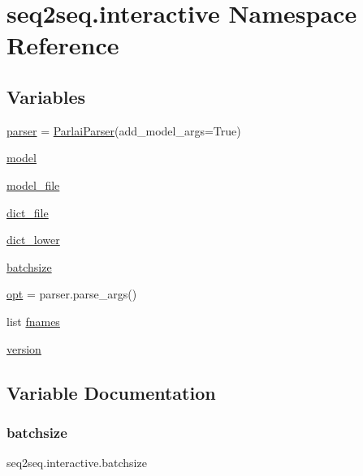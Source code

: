 \hypertarget{namespaceseq2seq_1_1interactive}{}\section{seq2seq.\+interactive Namespace Reference}
\label{namespaceseq2seq_1_1interactive}
\subsection*{Variables}
\begin{DoxyCompactItemize}
\item 
\hyperlink{namespaceseq2seq_1_1interactive_a30c7c17d3501869dc954ba79b1bb1703}{parser} = \hyperlink{classparlai_1_1core_1_1params_1_1ParlaiParser}{Parlai\+Parser}(add\+\_\+model\+\_\+args=True)
\item 
\hyperlink{namespaceseq2seq_1_1interactive_a22e0b789d68f198e7dbf8134db94fb71}{model}
\item 
\hyperlink{namespaceseq2seq_1_1interactive_a94386ae1e7e78ebdee68773a101d7706}{model\+\_\+file}
\item 
\hyperlink{namespaceseq2seq_1_1interactive_a0f5b8bb9f14ec40ff88586a81daca1cd}{dict\+\_\+file}
\item 
\hyperlink{namespaceseq2seq_1_1interactive_a52b9426742f4f10a787e41539194123c}{dict\+\_\+lower}
\item 
\hyperlink{namespaceseq2seq_1_1interactive_a9a9ffa86966f79dad851a9485b33f298}{batchsize}
\item 
\hyperlink{namespaceseq2seq_1_1interactive_a6a0cb415a1fef0f71edba01a96d53dba}{opt} = parser.\+parse\+\_\+args()
\item 
list \hyperlink{namespaceseq2seq_1_1interactive_a448aca2607645ec086f97c4403a6b055}{fnames}
\item 
\hyperlink{namespaceseq2seq_1_1interactive_ae79ed748b505aa1b31aab802d43545df}{version}
\end{DoxyCompactItemize}


\subsection{Variable Documentation}
\mbox{\label{namespaceseq2seq_1_1interactive_a9a9ffa86966f79dad851a9485b33f298}} 
\subsubsection{\texorpdfstring{batchsize}{batchsize}}
{\footnotesize\ttfamily seq2seq.\+interactive.\+batchsize}

